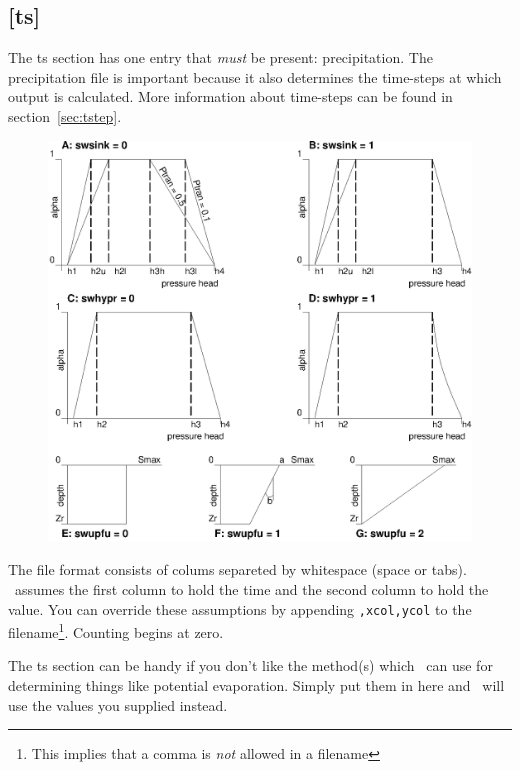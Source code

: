 \subsection{[ts]}\label{section:ts}
The ts section has one entry that {\em must} be present:
precipitation.  The precipitation file is important because it also
determines the time-steps at which output is calculated. More
information about time-steps can be found in
section~\ref{sec:tstep}. 
\begin{figure}
\includegraphics{psfig/soilr.eps}
\end{figure}

The file format consists of colums separeted by whitespace (space
or tabs).  \vamps\ assumes the first column to hold the time and the
second column to hold the value. You can override these assumptions by
appending {\tt ,xcol,ycol} to the filename\footnote{This implies that a comma
is {\em not} allowed in a filename}. Counting begins at zero.

The ts section can be handy if you don't like the method(s) which
\vamps\ can use for determining things like potential evaporation.
Simply put them in here and \vamps\ will use the values you supplied
instead.

